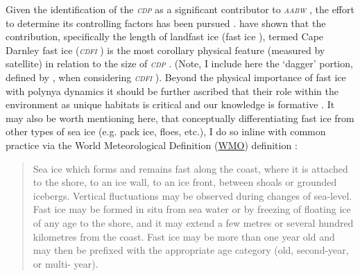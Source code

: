 \documentclass[11pt,a4paper]{article}
\newcommand{\aabw}{\textit{\textsc{{aabw }}}} %
\newcommand{\cdp}{\textit{\textsc{{cdp }}}} %
\newcommand{\cdfi}{\textit{\textsc{{cdfi }}}}
\newcommand{\fastice}{fast ice }
\newcommand{\wmo}{\href{https://public.wmo.int/en}{\uppercase{wmo}}}
\begin{document}
Given the identification of the \cdp as a significant contributor to \aabw, the
effort to determine its controlling factors has been pursued \citep{nakayamaNumericalInvestigationFormation2014,liuModelingModifiedCircumpolar2017}. \cite{fraserLandfastIceControls2019}
have shown that the contribution, specifically the length of landfast
ice (\fastice), termed Cape Darnley \fastice (\cdfi) is the most corollary physical feature (measured by satellite) in relation to the size of \cdp. (Note, I
include here the `dagger' portion, defined by \cite{fraserLandfastIceControls2019}, when
considering \cdfi). Beyond the physical importance of \fastice with polynya
dynamics it should be further ascribed that their role within the environment as unique habitats
is critical and our knowledge is formative \citep{trathanFirstRecordedLoss2011,ainleyApparentPopulationDecrease2015a}. It may also be worth mentioning here, that conceptually
differentiating \fastice from other types of sea ice (e.g. pack
ice, floes, etc.), I do so inline with common practice via the World
Meteorological Definition (\wmo) definition \cite{wmoWMOSeaiceNomenclature1970}:
\begin{quote}
  Sea ice which forms and remains fast along the coast, where it is attached to
  the shore, to an ice wall, to an ice front, between shoals or grounded
  icebergs. Vertical fluctuations may be observed during changes of sea-level.
  Fast ice may be formed in situ from sea water or by freezing of floating ice
  of any age to the shore, and it may extend a few metres or several hundred
  kilometres from the coast. Fast ice may be more than one year old and may then
  be prefixed with the appropriate age category (old, second-year, or multi-
  year).
\end{quote}
\end{document}
